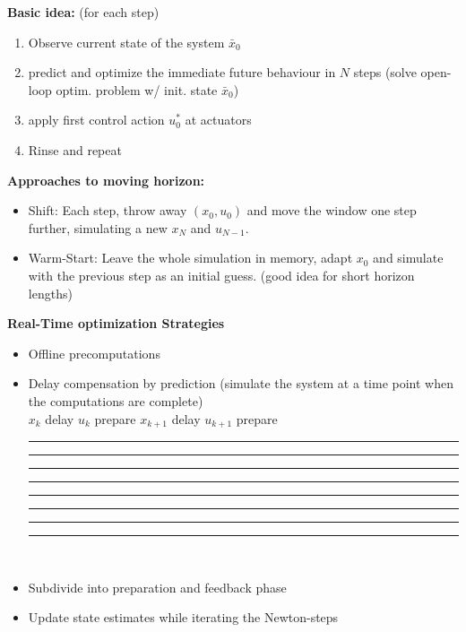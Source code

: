 \begin{tcolorbox}[colback=orange!5!white, %
  colframe=orange!75!black, %
  title=\textbf{Model Predictive Control \& Moving Horizon Estimation}]
  \textbf{Basic idea:} (for each step) \\
  \begin{enumerate}
  \item Observe current state of the system $\bar{x}_0$
  \item predict and optimize the immediate future behaviour in $N$ steps (solve
    open-loop optim. problem w/ init. state $\bar{x}_0$)
  \item apply first control action $u_0^*$ at actuators
  \item Rinse and repeat
  \end{enumerate}
  \textbf{Approaches to moving horizon:}\\
  \begin{itemize}
  \item Shift: Each step, throw away $(x_0,u_0)$ and move the window one step
    further, simulating a new $x_N$ and $u_{N-1}$.
  \item Warm-Start: Leave the whole simulation in memory, adapt $x_0$ and
    simulate with the previous step as an initial guess. (good idea for short
    horizon lengths)
  \end{itemize}
  \textbf{Real-Time optimization Strategies}\\
  \begin{itemize}
  \item Offline precomputations
  \item Delay compensation by prediction (simulate the system at a time point
    when the computations are complete)\\
$x_k$ delay \hspace{.5mm} $u_k$ \hspace{.5cm}prepare \hspace{1.cm} $x_{k+1}$ delay $u_{k+1}$ \hspace{.2cm}prepare\\
{\textcolor{black}{\rule{1mm}{2mm}}}{\textcolor{red}{\rule{1.2cm}{1mm}}}{\textcolor{blue}{\rule{1mm}{2mm}}}{\textcolor{green}{\rule{3cm}{1mm}}}{\textcolor{black}{\rule{1mm}{2mm}}}{\textcolor{red}{\rule{1.2cm}{1mm}}}{\textcolor{blue}{\rule{1mm}{2mm}}}{\textcolor{green}{\rule{1.5cm}{1mm}}}\\
  \item Subdivide into preparation and feedback phase
  \item Update state estimates while iterating the Newton-steps
  \end{itemize}
\end{tcolorbox}
